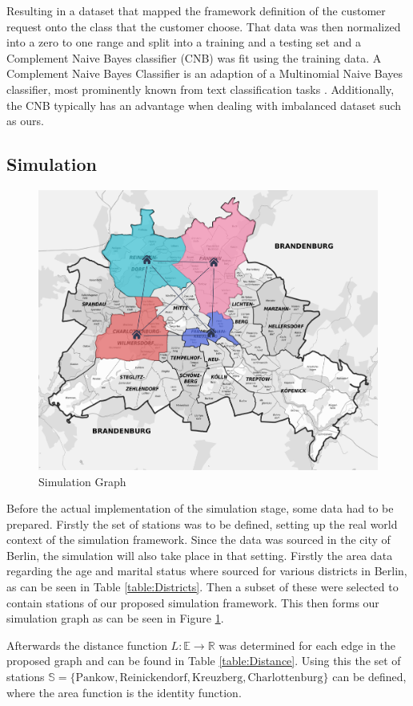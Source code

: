 Resulting in a dataset that mapped the framework definition of the customer request onto the class that the customer choose.
That data was then normalized into a zero to one range and split into a
training and a testing set and a Complement Naive Bayes classifier (CNB) was fit using
the training data. A Complement Naive Bayes Classifier is an adaption of a Multinomial Naive Bayes classifier, most
prominently known from text classification tasks \cite{rennie2003tackling}. Additionally, the CNB typically has an advantage when dealing
with imbalanced dataset such as ours.


\subsection{Simulation}
\label{sub_sec:CaseStudy/Simulation}

\begin{figure}[htbp]
  \centering
  \includegraphics[width=.5\linewidth]{./Figures/graph.png}
  \caption{Simulation Graph}
  \label{fig:Graph}
\end{figure}
Before the actual implementation of the simulation stage, some data had to be prepared. Firstly 
the set of stations was to be defined, setting up the real world context of the simulation 
framework. Since the data was sourced in the city of Berlin, the simulation will also take place
in that setting. Firstly the area data regarding the age and marital status where sourced for various
districts in Berlin, as can be seen in Table \ref{table:Districts}. Then a subset of these were selected
to contain stations of our proposed simulation framework. This then forms our simulation graph as can be
seen in Figure \ref{fig:Graph}.


Afterwards the distance function $L: \mathbb{E} \to \mathbb{R}$ was determined for each edge in the proposed graph and can be found
in Table \ref{table:Distance}. Using this the set of stations $\mathbb{S} = \{ \text{Pankow}, \text{Reinickendorf}, \text{Kreuzberg}, \text{Charlottenburg} \}$ can be defined,
where the area function is the identity function. 

